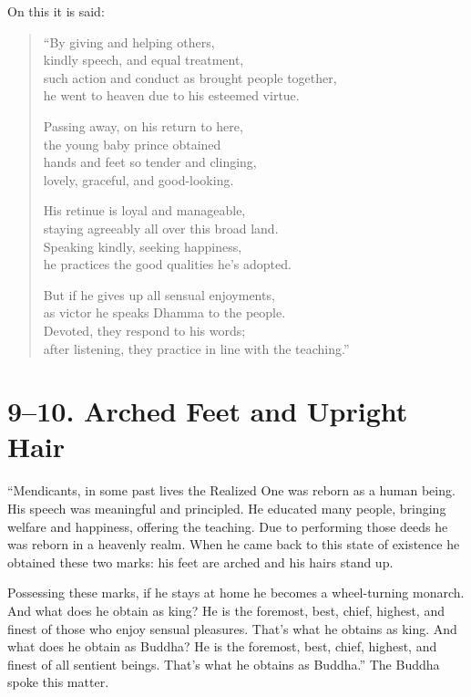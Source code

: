 \documentclass[12pt,openany]{book}%
\begin{document}
On this it is said: 

\begin{verse}%
“By giving and helping others, \\
kindly speech, and equal treatment, \\
such action and conduct as brought people together, \\
he went to heaven due to his esteemed virtue. 

Passing away, on his return to here, \\
the young baby prince obtained \\
hands and feet so tender and clinging, \\
lovely, graceful, and good-looking. 

His retinue is loyal and manageable, \\
staying agreeably all over this broad land. \\
Speaking kindly, seeking happiness, \\
he practices the good qualities he’s adopted. 

But if he gives up all sensual enjoyments, \\
as victor he speaks Dhamma to the people. \\
Devoted, they respond to his words; \\
after listening, they practice in line with the teaching.” 

%
\end{verse}

\section*{9–10. Arched Feet and Upright Hair }

“Mendicants, in some past lives the Realized One was reborn as a human being. His speech was meaningful and principled. He educated many people, bringing welfare and happiness, offering the teaching. Due to performing those deeds he was reborn in a heavenly realm. When he came back to this state of existence he obtained these two marks: his feet are arched and his hairs stand up. 

Possessing these marks, if he stays at home he becomes a wheel-turning monarch. And what does he obtain as king? He is the foremost, best, chief, highest, and finest of those who enjoy sensual pleasures. That’s what he obtains as king. And what does he obtain as Buddha? He is the foremost, best, chief, highest, and finest of all sentient beings. That’s what he obtains as Buddha.” The Buddha spoke this matter. 
\end{document}
